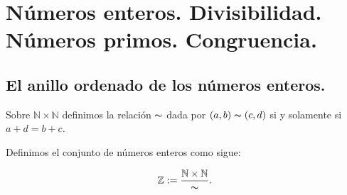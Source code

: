 \chapter{Números enteros. Divisibilidad. Números primos. Congruencia.}

\section{El anillo ordenado de los números enteros.}

Sobre $\mathbb{N}\times\mathbb{N}$ definimos la relación $\thicksim$ dada por $\left(a,b\right)\thicksim\left(c,d\right)$ si y solamente si $a+d=b+c$. 


Definimos el conjunto de números enteros como sigue:

\begin{equation}
  \mathbb{Z}:=\frac{\mathbb{N}\times\mathbb{N}}{\thicksim}.
\end{equation}

